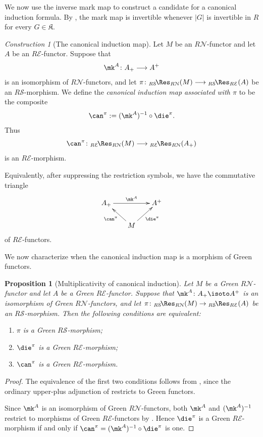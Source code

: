 \documentclass{amsart}
\numberwithin{equation}{section}%
\newtheorem{Prop}[equation]{Proposition}
\theoremstyle{remark}
\newtheorem{Cons}[equation]{Construction}
\theoremstyle{definition}
\newcommand{\e}{\mathcal E}
\newcommand{\s}{\mathcal S}
\newcommand{\n}{\mathcal N}
\newcommand{\lRes}[1]{{}_{#1}\!\Res}
\begin{document}
%
We now use the inverse mark map to construct a candidate
for a canonical induction formula. By
, the mark map is invertible
whenever $|G|$ is invertible in $R$ for every
$G\in\mathfrak K$.
%
\begin{Cons}[The canonical induction map]
\label{con:canonical-induction-map}
Let $M$ be an $R\n$-functor and let $A$ be an
$R\e$-functor. Suppose that
%
\[
\mk^A\colon A_+\longrightarrow A^+
\]
%
is an isomorphism of $R\n$-functors, and let
$\pi\colon
{}\lRes{R\s}_{R\n}(M)
\longrightarrow
{}\lRes{R\s}_{R\e}(A)$
be an $R\s$-morphism.
We define the \emph{canonical induction map associated with $\pi$}
to be the composite
%
\[
\can^\pi
:=
(\mk^A)^{-1}\circ\die^\pi.
\]
%
Thus
%
\[
\can^\pi\colon
{}\lRes{R\e}_{R\n}(M)
\longrightarrow
{}\lRes{R\e}_{R\n}(A_+)
\]
%
is an $R\e$-morphism.

Equivalently, after suppressing the restriction symbols, we have the
commutative triangle
%
\[
\xymatrix@R=4ex@C=4ex{
	A_+ \ar[rr]^{\mk^A} && A^+\\
	& M \ar[lu]^{\can^\pi}\ar[ru]_{\die^\pi} &
}
\]
%
of $R\e$-functors.
\end{Cons}
%
We now characterize when the canonical induction map
is a morphism of Green functors.
%
\begin{Prop}[Multiplicativity of canonical induction]
\label{prop:canonical-induction-multiplicative}
Let $M$ be a Green $R\n$-functor and let $A$ be a Green
$R\e$-functor. Suppose that
$\mk^A\colon A_+\isoto A^+$
is an isomorphism of Green $R\n$-functors, and let
$\pi\colon
{}\lRes{R\s}_{R\n}(M)
\to
{}\lRes{R\s}_{R\e}(A)$
be an $R\s$-morphism.
Then the following conditions are equivalent:
\begin{enumerate}
	\item $\pi$ is a Green $R\s$-morphism;
	\item $\die^\pi$ is a Green $R\e$-morphism;
	\item $\can^\pi$ is a Green $R\e$-morphism.
\end{enumerate}
\end{Prop}
%
\begin{proof}
The equivalence of the first two conditions follows from
, since the ordinary upper-plus
adjunction of  restricts to Green
functors.

Since $\mk^A$ is an isomorphism of Green $R\n$-functors, both
$\mk^A$ and $(\mk^A)^{-1}$ restrict to morphisms of Green
$R\e$-functors by . Hence
$\die^\pi$ is a Green $R\e$-morphism if and only if
$\can^\pi=(\mk^A)^{-1}\circ\die^\pi$ is one.
\end{proof}
\end{document}
